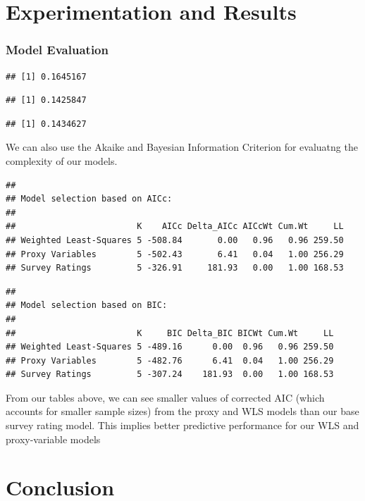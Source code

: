 \documentclass[
  man,floatsintext]{apa6}
\begin{document}
\hypertarget{experimentation-and-results}{%
\section{Experimentation and Results}\label{experimentation-and-results}}

\hypertarget{model-evaluation}{%
\subsubsection{Model Evaluation}\label{model-evaluation}}

\begin{verbatim}
## [1] 0.1645167
\end{verbatim}

\begin{verbatim}
## [1] 0.1425847
\end{verbatim}

\begin{verbatim}
## [1] 0.1434627
\end{verbatim}

We can also use the Akaike and Bayesian Information Criterion for evaluatng the complexity of our models.

\begin{verbatim}
## 
## Model selection based on AICc:
## 
##                        K    AICc Delta_AICc AICcWt Cum.Wt     LL
## Weighted Least-Squares 5 -508.84       0.00   0.96   0.96 259.50
## Proxy Variables        5 -502.43       6.41   0.04   1.00 256.29
## Survey Ratings         5 -326.91     181.93   0.00   1.00 168.53
\end{verbatim}

\begin{verbatim}
## 
## Model selection based on BIC:
## 
##                        K     BIC Delta_BIC BICWt Cum.Wt     LL
## Weighted Least-Squares 5 -489.16      0.00  0.96   0.96 259.50
## Proxy Variables        5 -482.76      6.41  0.04   1.00 256.29
## Survey Ratings         5 -307.24    181.93  0.00   1.00 168.53
\end{verbatim}

From our tables above, we can see smaller values of corrected AIC (which accounts for smaller sample sizes) from the proxy and WLS models than our base survey rating model. This implies better predictive performance for our WLS and proxy-variable models

\hypertarget{conclusion}{%
\section{Conclusion}\label{conclusion}}
\end{document}
